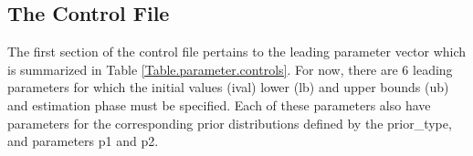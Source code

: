 
\begin{multicols}{2}
\subsection{The Control File} %
\label{sub:the_control_file}


The first section of the control file pertains to the leading parameter vector which is summarized in Table \ref{Table.parameter.controls}.  For now, there are 6 leading parameters for which the initial values (ival) lower (lb) and upper bounds (ub) and estimation phase must be specified.  Each of these parameters also have parameters for the corresponding prior distributions defined by the prior\_type, and parameters p1 and p2.


\end{multicols}
